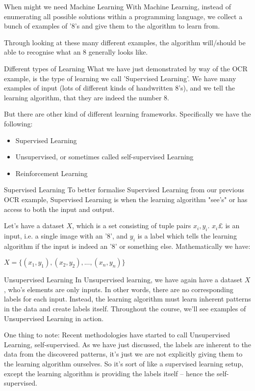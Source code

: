 \documentclass[10pt]{beamer}
\begin{document}
\begin{frame}[label={sec:orgbb518d6}]{When might we need Machine Learning}
With Machine Learning, instead of enumerating all possible solutions within a
programming language, we collect a bunch of examples of '8's and give them to the
algorithm to learn from.

Through looking at these many different examples, the algorithm will/should be able
to recognise what an 8 generally looks like.
\end{frame}

\begin{frame}[label={sec:org1cc246f}]{Different types of Learning}
What we have just demonstrated by way of the OCR example, is the type of learning we
call 'Supervised Learning'. We have many examples of input (lots of different kinds
of handwritten 8's), and we tell the learning algorithm, that they are indeed the
number 8.

But there are other kind of different learning frameworks. Specifically we have the
following:

\begin{itemize}
\item Supervised Learning
\item Unsupervised, or sometimes called self-supervised Learning
\item Reinforcement Learning
\end{itemize}
\end{frame}

\begin{frame}[label={sec:org0d33047}]{Supervised Learning}
To better formalise Supervised Learning from our previous OCR example, Supervised
Learning is when the learning algorithm "see's" or has access to both the input and
output.

Let's have a dataset \(X\), which is a set consisting of tuple pairs \(x_i, y_i\). \(x_i£\)
is an input, i.e. a single image with an '8', and \(y_i\) is a label which tells the
learning algorithm if the input is indeed an '8' or something else. Mathematically we have:

\(X = \{(x_1, y_1), (x_2, y_2), ..., (x_n, y_n)\}\)
\end{frame}

\begin{frame}[label={sec:org1772ba1}]{Unsupervised Learning}
In Unsupervised learning, we have again have a dataset \(X\), who's elements are only
inputs. In other words, there are no corresponding labels for each input. Instead,
the learning algorithm must learn inherent patterns in the data and create labels
itself. Throughout the course, we'll see examples of Unsupervised Learning in action.

One thing to note: Recent methodologies have started to call Unsupervised Learning,
self-supervised. As we have just discussed, the labels are inherent to the data from
the discovered patterns, it's just we are not explicitly giving them to the learning
algorithm ourselves. So it's sort of like a supervised learning setup, except the
learning algorithm is providing the labels itself -- hence the self-supervised.
\end{frame}
\end{document}
